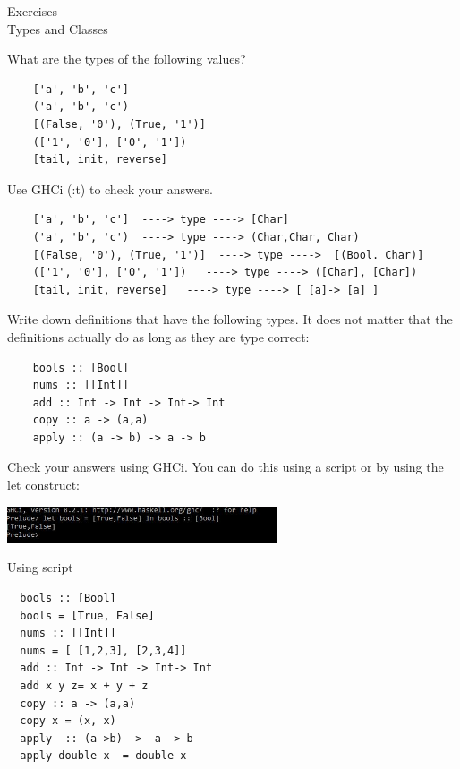 \documentclass{article}
\newcommand\ExTitle{Types and Classes \ }
\newcommand\fullExTitle{Exercises \\ \ExTitle }
\begin{document}
\begin{Huge}
	\begin{center}
	\fullExTitle
	\end{center}
\end{Huge}

\begin{Exercise} 
%
	
  What are the types of the following values?  \\
\begin{lstlisting}
    ['a', 'b', 'c']
    ('a', 'b', 'c')
    [(False, '0'), (True, '1')]
    (['1', '0'], ['0', '1'])
    [tail, init, reverse]	
\end{lstlisting}
   Use GHCi (:t) to check your answers. 
\end{Exercise}
\begin{Answer}
\begin{lstlisting}
    ['a', 'b', 'c']  ----> type ----> [Char]
    ('a', 'b', 'c')  ----> type ----> (Char,Char, Char)
    [(False, '0'), (True, '1')]  ----> type ---->  [(Bool. Char)]
    (['1', '0'], ['0', '1'])   ----> type ----> ([Char], [Char])
    [tail, init, reverse]	----> type ----> [ [a]-> [a] ]
\end{lstlisting}
\end{Answer}



\begin{Exercise}
   Write down definitions that have the following types. It does not matter that the definitions actually do as long as they are type correct:
\begin{lstlisting}
    bools :: [Bool]
    nums :: [[Int]]
    add :: Int -> Int -> Int-> Int
    copy :: a -> (a,a)
    apply :: (a -> b) -> a -> b	
\end{lstlisting}
Check your answers using GHCi. You can do this using a script or by using the let construct: \\
\begin{center}
	\includegraphics[width=8cm]{img/01.jpg}
\end{center}
\end{Exercise}
\begin{Answer}
Using script 
\begin{lstlisting}
  bools :: [Bool]
  bools = [True, False]
  nums :: [[Int]]
  nums = [ [1,2,3], [2,3,4]]
  add :: Int -> Int -> Int-> Int
  add x y z= x + y + z
  copy :: a -> (a,a)
  copy x = (x, x)
  apply  :: (a->b) ->  a -> b
  apply double x  = double x
\end{lstlisting}
\end{Answer}
\end{document}
